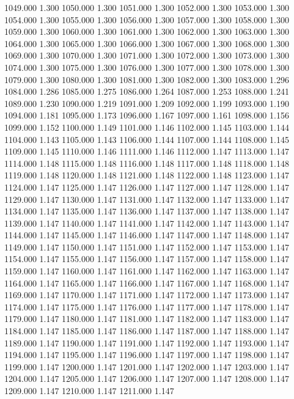 1049.000 1.300 
1050.000 1.300 
1051.000 1.300 
1052.000 1.300 
1053.000 1.300 
1054.000 1.300 
1055.000 1.300 
1056.000 1.300 
1057.000 1.300 
1058.000 1.300 
1059.000 1.300 
1060.000 1.300 
1061.000 1.300 
1062.000 1.300 
1063.000 1.300 
1064.000 1.300 
1065.000 1.300 
1066.000 1.300 
1067.000 1.300 
1068.000 1.300 
1069.000 1.300 
1070.000 1.300 
1071.000 1.300 
1072.000 1.300 
1073.000 1.300 
1074.000 1.300 
1075.000 1.300 
1076.000 1.300 
1077.000 1.300 
1078.000 1.300 
1079.000 1.300 
1080.000 1.300 
1081.000 1.300 
1082.000 1.300 
1083.000 1.296 
1084.000 1.286 
1085.000 1.275 
1086.000 1.264 
1087.000 1.253 
1088.000 1.241 
1089.000 1.230 
1090.000 1.219 
1091.000 1.209 
1092.000 1.199 
1093.000 1.190 
1094.000 1.181 
1095.000 1.173 
1096.000 1.167 
1097.000 1.161 
1098.000 1.156 
1099.000 1.152 
1100.000 1.149 
1101.000 1.146 
1102.000 1.145 
1103.000 1.144 
1104.000 1.143 
1105.000 1.143 
1106.000 1.144 
1107.000 1.144 
1108.000 1.145 
1109.000 1.145 
1110.000 1.146 
1111.000 1.146 
1112.000 1.147 
1113.000 1.147 
1114.000 1.148 
1115.000 1.148 
1116.000 1.148 
1117.000 1.148 
1118.000 1.148 
1119.000 1.148 
1120.000 1.148 
1121.000 1.148 
1122.000 1.148 
1123.000 1.147 
1124.000 1.147 
1125.000 1.147 
1126.000 1.147 
1127.000 1.147 
1128.000 1.147 
1129.000 1.147 
1130.000 1.147 
1131.000 1.147 
1132.000 1.147 
1133.000 1.147 
1134.000 1.147 
1135.000 1.147 
1136.000 1.147 
1137.000 1.147 
1138.000 1.147 
1139.000 1.147 
1140.000 1.147 
1141.000 1.147 
1142.000 1.147 
1143.000 1.147 
1144.000 1.147 
1145.000 1.147 
1146.000 1.147 
1147.000 1.147 
1148.000 1.147 
1149.000 1.147 
1150.000 1.147 
1151.000 1.147 
1152.000 1.147 
1153.000 1.147 
1154.000 1.147 
1155.000 1.147 
1156.000 1.147 
1157.000 1.147 
1158.000 1.147 
1159.000 1.147 
1160.000 1.147 
1161.000 1.147 
1162.000 1.147 
1163.000 1.147 
1164.000 1.147 
1165.000 1.147 
1166.000 1.147 
1167.000 1.147 
1168.000 1.147 
1169.000 1.147 
1170.000 1.147 
1171.000 1.147 
1172.000 1.147 
1173.000 1.147 
1174.000 1.147 
1175.000 1.147 
1176.000 1.147 
1177.000 1.147 
1178.000 1.147 
1179.000 1.147 
1180.000 1.147 
1181.000 1.147 
1182.000 1.147 
1183.000 1.147 
1184.000 1.147 
1185.000 1.147 
1186.000 1.147 
1187.000 1.147 
1188.000 1.147 
1189.000 1.147 
1190.000 1.147 
1191.000 1.147 
1192.000 1.147 
1193.000 1.147 
1194.000 1.147 
1195.000 1.147 
1196.000 1.147 
1197.000 1.147 
1198.000 1.147 
1199.000 1.147 
1200.000 1.147 
1201.000 1.147 
1202.000 1.147 
1203.000 1.147 
1204.000 1.147 
1205.000 1.147 
1206.000 1.147 
1207.000 1.147 
1208.000 1.147 
1209.000 1.147 
1210.000 1.147 
1211.000 1.147 
